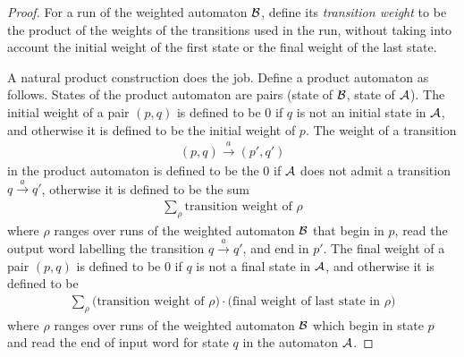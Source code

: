 \begin{proof} 
For a run of the weighted automaton $\mathcal{B}$, define its \emph{transition weight}  to be the product of the weights of the transitions used in the run, without taking into account the initial weight of the first state  or the final weight of the last state. 

A natural product construction does the job.
Define a product automaton   as follows. States of the product automaton are pairs (state of $ \mathcal{B}$, state of $\mathcal{A}$).   The initial weight of a pair $( p,  q)$ is defined to be $0$ if $q$ is not an initial state in $\mathcal{A}$, and otherwise it is defined to be the initial weight of $p$. 
The weight of a transition 
\begin{align*}
(p, q) \stackrel a \to ({p'},{q'})
\end{align*}
in the product automaton is defined to be the $0$ if $\mathcal{A}$ does not admit a transition $q \stackrel a \to q'$, otherwise it is   defined to be the sum
\begin{align*}
\sum_{ \rho } \text{transition weight of $\rho$}  
\end{align*}
where $\rho$  ranges over runs of the weighted automaton $ \mathcal{B}$ that begin in $p$, read the output word labelling the transition $q \stackrel a \to q'$, and end  in $p'$.   The final weight of a pair $( p,  q)$ is defined to be $0$ if $q$ is not a final state in $\mathcal{A}$, and otherwise it is defined to be
\begin{align*}
\sum_\rho   \text{(transition weight of $\rho$)} \cdot \text{(final weight of last state in $\rho$)} 
\end{align*}
where $\rho$ ranges over runs of the weighted automaton $\mathcal{B}$ which begin in state $p$ and read the end of input word for  state $q$ in the automaton $\mathcal{A}$.   
  \end{proof}

